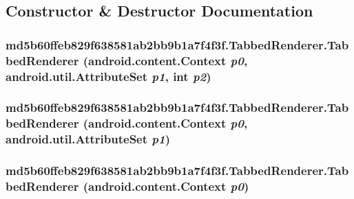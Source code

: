 \subsection{Constructor \& Destructor Documentation}
\hypertarget{classmd5b60ffeb829f638581ab2bb9b1a7f4f3f_1_1_tabbed_renderer_58094d971cda65d13a4494b4c01d6606}{
\subsubsection[{TabbedRenderer}]{\setlength{\rightskip}{0pt plus 5cm}md5b60ffeb829f638581ab2bb9b1a7f4f3f.TabbedRenderer.TabbedRenderer (android.content.Context {\em p0}, \/  android.util.AttributeSet {\em p1}, \/  int {\em p2})}}
\label{classmd5b60ffeb829f638581ab2bb9b1a7f4f3f_1_1_tabbed_renderer_58094d971cda65d13a4494b4c01d6606}


\hypertarget{classmd5b60ffeb829f638581ab2bb9b1a7f4f3f_1_1_tabbed_renderer_3b8fd0e5dc0df3553dda11d43292045a}{
\subsubsection[{TabbedRenderer}]{\setlength{\rightskip}{0pt plus 5cm}md5b60ffeb829f638581ab2bb9b1a7f4f3f.TabbedRenderer.TabbedRenderer (android.content.Context {\em p0}, \/  android.util.AttributeSet {\em p1})}}
\label{classmd5b60ffeb829f638581ab2bb9b1a7f4f3f_1_1_tabbed_renderer_3b8fd0e5dc0df3553dda11d43292045a}


\hypertarget{classmd5b60ffeb829f638581ab2bb9b1a7f4f3f_1_1_tabbed_renderer_1e7ca4d75fddda52cec47dee49875855}{
\subsubsection[{TabbedRenderer}]{\setlength{\rightskip}{0pt plus 5cm}md5b60ffeb829f638581ab2bb9b1a7f4f3f.TabbedRenderer.TabbedRenderer (android.content.Context {\em p0})}}
\label{classmd5b60ffeb829f638581ab2bb9b1a7f4f3f_1_1_tabbed_renderer_1e7ca4d75fddda52cec47dee49875855}




